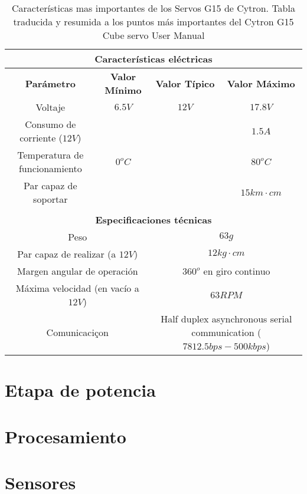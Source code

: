     \begin{table}[H]
    	\caption{Características mas importantes de los Servos G15 de Cytron. Tabla traducida y resumida a los puntos más importantes del Cytron G15 Cube servo User Manual \cite{CytronTechnologies2012} }
    	\label{tab:g15_catact}
    	\begin{center}
    		\begin{minipage}{\textwidth}
    			\begin{tabular}{ |c|c|c|c| }
    				\hline
    				\multicolumn{4}{|c|}{\textbf{Características eléctricas}} \\ 
    				\hline
    				\textbf{Parámetro} & \textbf{Valor Mínimo} & \textbf{Valor Típico} & \textbf{Valor Máximo} \\
    				\hline
					Voltaje & $6.5V$ & $12V$ & $17.8V$ \\
    				\hline
    				Consumo de corriente ($12V$) & & & $1.5A$ \\
    				\hline
    				Temperatura de funcionamiento & $0^oC$ & & $80^oC$ \\
    				\hline
    				Par capaz de soportar & & & $15km \cdot cm$ \\
    				\hline
    				\multicolumn{4}{c}{\textbf{}} \\ 
    				\hline
    				\multicolumn{4}{|c|}{\textbf{Especificaciones técnicas}} \\ 
    				\hline
    				\multicolumn{2}{|c|}{Peso} & \multicolumn{2}{|c|}{$63g$}\\ 
    				\hline
    				\multicolumn{2}{|c|}{Par capaz de realizar (a $12V$)} & \multicolumn{2}{|c|}{$12kg \cdot cm$}\\ 
    				\hline
    				\multicolumn{2}{|c|}{Margen angular de operación } & \multicolumn{2}{|c|}{$360^o$ en giro continuo}\\ 
    				\hline
    				\multicolumn{2}{|c|}{Máxima velocidad (en vacío a $12V$)} & \multicolumn{2}{|c|}{$63 RPM$ }\\ 
    				\hline    			
    				\multicolumn{2}{|c|}{Comunicaciçon} & \multicolumn{2}{|c|}{Half duplex asynchronous serial communication ($7812.5bps-500kbps $)}\\ 
    				\hline    				 	 
    			\end{tabular}
    		\end{minipage}
    	\end{center}
    \end{table}

\section{Etapa de potencia} \label{sec:Electronica:Potencia}

\section{Procesamiento}

\section{Sensores} \label{sec:Electronica:Sensores}



